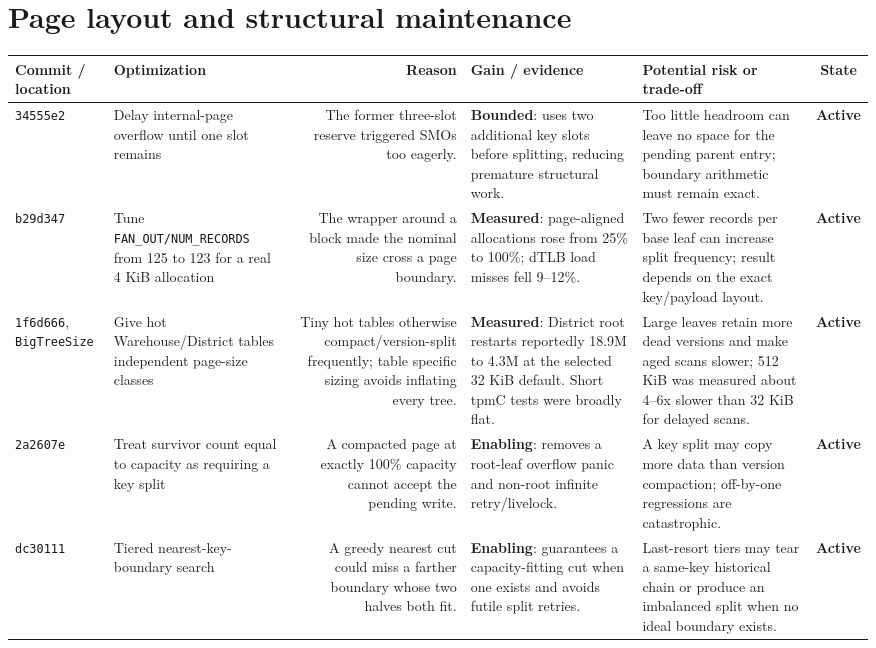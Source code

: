 \documentclass[10pt,a4paper,landscape]{article}
\newcommand{\code}[1]{\texttt{#1}}
\newcommand{\commit}[1]{\code{#1}}
\newcommand{\gainmeasured}{\textbf{Measured}}
\newcommand{\gainbounded}{\textbf{Bounded}}
\newcommand{\gainenabling}{\textbf{Enabling}}
\newcommand{\stateactive}{\textbf{Active}}
\begin{document}
\section{Page layout and structural maintenance}

\begin{longtable}{IORGKS}
\toprule
\textbf{Commit / location} & \textbf{Optimization} & \textbf{Reason} &
\textbf{Gain / evidence} & \textbf{Potential risk or trade-off} & \textbf{State} \\
\midrule
\endhead
\commit{34555e2} & Delay internal-page overflow until one slot remains & The former
three-slot reserve triggered SMOs too eagerly. & \gainbounded: uses two additional key slots
before splitting, reducing premature structural work. & Too little headroom can leave no
space for the pending parent entry; boundary arithmetic must remain exact. & \stateactive \\

\commit{b29d347} & Tune \code{FAN\_OUT/NUM\_RECORDS} from 125 to 123 for a real 4 KiB
allocation & The wrapper around a block made the nominal size cross a page boundary. &
\gainmeasured: page-aligned allocations rose from 25\% to 100\%; dTLB load misses fell
9--12\%. & Two fewer records per base leaf can increase split frequency; result depends
on the exact key/payload layout. & \stateactive \\

\commit{1f6d666}, \code{BigTreeSize} & Give hot Warehouse/District tables independent
page-size classes & Tiny hot tables otherwise compact/version-split frequently; table
specific sizing avoids inflating every tree. & \gainmeasured: District root restarts reportedly
18.9M to 4.3M at the selected 32 KiB default. Short tpmC tests were broadly flat. & Large
leaves retain more dead versions and make aged scans slower; 512 KiB was measured about
4--6x slower than 32 KiB for delayed scans. & \stateactive \\

\commit{2a2607e} & Treat survivor count equal to capacity as requiring a key split & A
compacted page at exactly 100\% capacity cannot accept the pending write. & \gainenabling:
removes a root-leaf overflow panic and non-root infinite retry/livelock. & A key split may
copy more data than version compaction; off-by-one regressions are catastrophic. &
\stateactive \\

\commit{dc30111} & Tiered nearest-key-boundary search & A greedy nearest cut could miss a
farther boundary whose two halves both fit. & \gainenabling: guarantees a capacity-fitting
cut when one exists and avoids futile split retries. & Last-resort tiers may tear a
same-key historical chain or produce an imbalanced split when no ideal boundary exists. &
\stateactive \\


\end{longtable}
\end{document}
